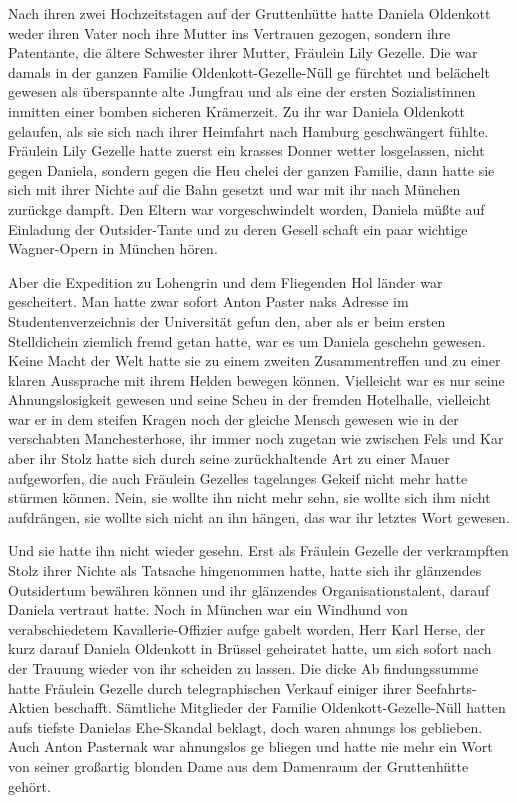 Nach ihren zwei Hochzeitstagen auf der Gruttenhütte hatte
Daniela Oldenkott weder ihren Vater noch ihre Mutter ins
Vertrauen gezogen, sondern ihre Patentante, die ältere
Schwester ihrer Mutter, Fräulein Lily Gezelle. Die war
damals in der ganzen Familie Oldenkott-Gezelle-Nüll ge\-%
fürchtet und belächelt gewesen als überspannte alte Jungfrau
und als eine der ersten Sozialistinnen inmitten einer bomben\-%
sicheren Krämerzeit. Zu ihr war Daniela Oldenkott gelaufen,
als sie sich nach ihrer Heimfahrt nach Hamburg geschwängert
fühlte. Fräulein Lily Gezelle hatte zuerst ein krasses Donner\-%
wetter losgelassen, nicht gegen Daniela, sondern gegen die Heu\-%
chelei der ganzen Familie, dann hatte sie sich mit ihrer Nichte
auf die Bahn gesetzt und war mit ihr nach München zurückge\-%
dampft. Den Eltern war vorgeschwindelt worden, Daniela
müßte auf Einladung der Outsider-Tante und zu deren Gesell\-%
schaft ein paar wichtige Wagner-Opern in München hören.

Aber die Expedition zu Lohengrin und dem Fliegenden Hol\-%
länder war gescheitert. Man hatte zwar sofort Anton Paster\-%
naks Adresse im Studentenverzeichnis der Universität gefun\-%
den, aber als er beim ersten Stelldichein ziemlich fremd getan
hatte, war es um Daniela geschehn gewesen. Keine Macht der
Welt hatte sie zu einem zweiten Zusammentreffen und zu
einer klaren Aussprache mit ihrem Helden bewegen können.
Vielleicht war es nur seine Ahnungslosigkeit gewesen und seine
Scheu in der fremden Hotelhalle, vielleicht war er in dem
steifen Kragen noch der gleiche Mensch gewesen wie in der
verschabten Manchesterhose, ihr immer noch zugetan wie
zwischen Fels und Kar\dopp{} aber ihr Stolz hatte sich durch seine
zurückhaltende Art zu einer Mauer aufgeworfen, die auch
Fräulein Gezelles tagelanges Gekeif nicht mehr hatte stürmen
können. Nein, sie wollte ihn nicht mehr sehn, sie wollte sich
ihm nicht aufdrängen, sie wollte sich nicht an ihn hängen,
das war ihr letztes Wort gewesen.

Und sie hatte ihn nicht wieder gesehn. Erst als Fräulein
Gezelle der verkrampften Stolz ihrer Nichte als Tatsache
hingenommen hatte, hatte sich ihr glänzendes Outsidertum
bewähren können und ihr glänzendes Organisationstalent,
darauf Daniela vertraut hatte. Noch in München war ein
Windhund von verabschiedetem Kavallerie-Offizier aufge\-%
gabelt worden, Herr Karl Herse, der kurz darauf Daniela
Oldenkott in Brüssel geheiratet hatte, um sich sofort nach der
Trauung wieder von ihr scheiden zu lassen. Die dicke Ab\-%
findungssumme hatte Fräulein Gezelle durch telegraphischen
Verkauf einiger ihrer Seefahrts-Aktien beschafft. Sämtliche
Mitglieder der Familie Oldenkott-Gezelle-Nüll hatten aufs
tiefste Danielas Ehe-Skandal beklagt, doch waren ahnungs\-%
los geblieben. Auch Anton Pasternak war ahnungslos ge\-%
bliegen und hatte nie mehr ein Wort von seiner großartig
blonden Dame aus dem Damenraum der Gruttenhütte
gehört.

